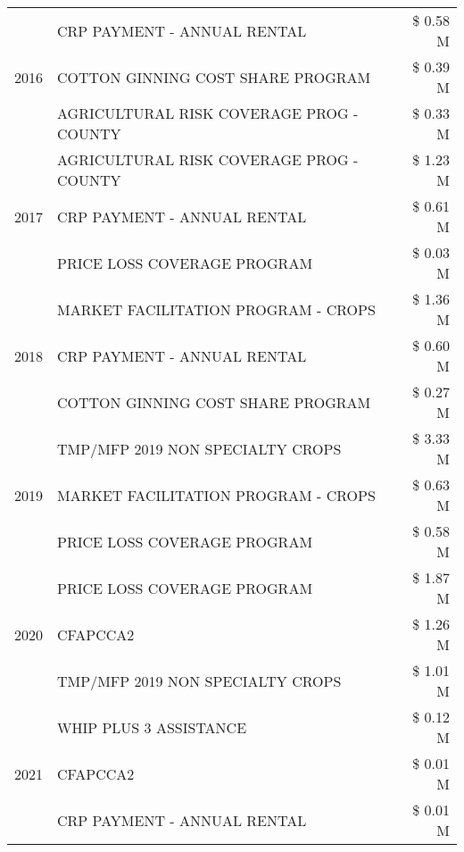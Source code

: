 \begin{tabular}{llr}
\multirow[t]{3}{*}{2016} & CRP PAYMENT - ANNUAL RENTAL & \$ 0.58 M \\
 & COTTON GINNING COST SHARE PROGRAM & \$ 0.39 M \\
 & AGRICULTURAL RISK COVERAGE PROG - COUNTY & \$ 0.33 M \\
\cline{1-3}
\multirow[t]{3}{*}{2017} & AGRICULTURAL RISK COVERAGE PROG - COUNTY & \$ 1.23 M \\
 & CRP PAYMENT - ANNUAL RENTAL & \$ 0.61 M \\
 & PRICE LOSS COVERAGE PROGRAM & \$ 0.03 M \\
\cline{1-3}
\multirow[t]{3}{*}{2018} & MARKET FACILITATION PROGRAM - CROPS & \$ 1.36 M \\
 & CRP PAYMENT - ANNUAL RENTAL & \$ 0.60 M \\
 & COTTON GINNING COST SHARE PROGRAM & \$ 0.27 M \\
\cline{1-3}
\multirow[t]{3}{*}{2019} & TMP/MFP 2019 NON SPECIALTY CROPS & \$ 3.33 M \\
 & MARKET FACILITATION PROGRAM - CROPS & \$ 0.63 M \\
 & PRICE LOSS COVERAGE PROGRAM & \$ 0.58 M \\
\cline{1-3}
\multirow[t]{3}{*}{2020} & PRICE LOSS COVERAGE PROGRAM & \$ 1.87 M \\
 & CFAPCCA2 & \$ 1.26 M \\
 & TMP/MFP 2019 NON SPECIALTY CROPS & \$ 1.01 M \\
\cline{1-3}
\multirow[t]{3}{*}{2021} & WHIP PLUS 3 ASSISTANCE & \$ 0.12 M \\
 & CFAPCCA2 & \$ 0.01 M \\
 & CRP PAYMENT - ANNUAL RENTAL & \$ 0.01 M \\
\cline{1-3}
\bottomrule
\end{tabular}
